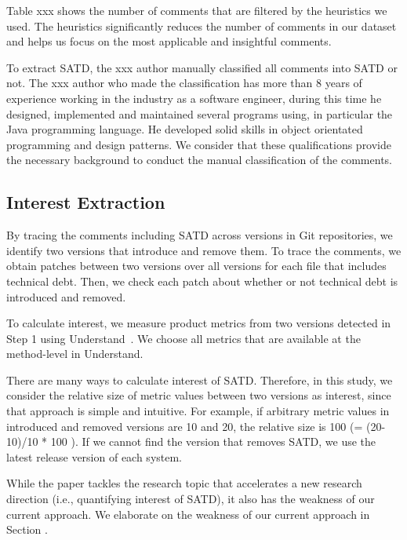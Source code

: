 \documentclass[conference]{IEEEtran}
\begin{document}
Table xxx shows the number of comments that are filtered by the heuristics we used. The heuristics significantly reduces the number of comments in our dataset and helps us focus on the most applicable and insightful comments. 


To extract SATD, the xxx author manually classified all comments into SATD or not.
The xxx author who made the classification has more than 8 years of experience working in the industry as a software engineer, during this time he designed, implemented and maintained several programs using, in particular the Java programming language. He developed solid skills in object orientated programming and design patterns. We consider that these qualifications provide the necessary background to conduct the manual classification of the comments.

\subsection{Interest Extraction} \label{subsec:interest}

By tracing the comments including SATD across versions in Git repositories, we identify two versions that introduce and remove them. To trace the comments, we obtain patches between two versions over all versions for each file that includes technical debt. Then, we check each patch about whether or not technical debt is introduced and removed. 

To calculate interest, we measure product metrics from two versions detected in Step 1 using {\sc Understand}~\cite{Understand}. We choose all metrics that are available at the method-level in {\sc Understand}.

There are many ways to calculate interest of SATD. Therefore, in this study, we consider the relative size of metric values between two versions as interest, since that approach is simple and intuitive. For example, if arbitrary metric values in introduced and removed versions are 10 and 20, the relative size is 100 (= (20-10)/10 * 100 ).
If we cannot find the version that removes SATD, 
we use the latest release version of each system. 

While the paper tackles the research topic that accelerates a new research direction (i.e., quantifying interest of SATD), it also has the weakness of our current approach. We elaborate on the weakness of our current approach in Section .
\end{document}
